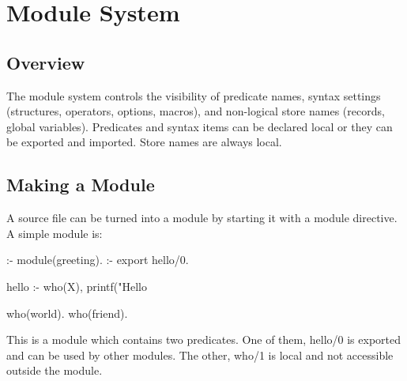 \section{Module System}
\label{secmodules}
\subsection{Overview}
The \eclipse{} module system controls the visibility of
predicate names,
syntax settings (structures, operators, options, macros),
and non-logical store names (records, global variables).
Predicates and syntax items can be declared local or
they can be exported and imported.
Store names are always local.


\subsection{Making a Module}
A source file can be turned into a module by starting it with a 
module directive. A simple module is:
\begin{code}
:- module(greeting).
:- export hello/0.

hello :-
        who(X),
        printf("Hello %

who(world).
who(friend).
\end{code}
This is a module which contains two predicates. One of them, hello/0
is exported and can be used by other modules. The other, who/1 is
local and not accessible outside the module.

